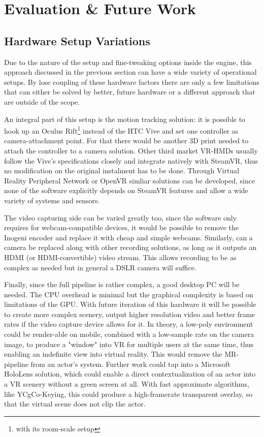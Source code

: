 %
\chapter{Evaluation \& Future Work}

\section{Hardware Setup Variations}
\label{sec:eval:hardware}

Due to the nature of the setup and fine-tweaking options inside the engine, 
this approach discussed in the previous section can have a wide variety of 
operational setups. By lose coupling of these hardware factors there are only a 
few limitations that can either be solved by better, future hardware or a 
different approach that are outside of the scope.

An integral part of this setup is the motion tracking solution: it is possible 
to hook up an Oculus Rift\footnote{with its room-scale setup} instead of the 
HTC Vive and set one controller as camera-attachment point. For that there 
would be another 3D print needed to attach the controller to a camera solution. 
\newline
Other third market VR-HMDs usually follow the Vive's specifications closely and 
integrate natively with SteamVR, thus no modification on the original 
instalment has to be done.
\newline
Through Virtual Reality Peripheral Network or OpenVR simliar solutions can be 
developed, since none of the software explicitly depends on SteamVR features 
and allow a wide variety of systems and sensors.

The video capturing side can be varied greatly too, since the software only 
requires for webcam-compatible devices, it would be possible to remove 
the Inogeni encoder and replace it with cheap and simple webcams. Similarly, 
can a camera be replaced along with other recording solutions, as long as it 
outputs an HDMI (or HDMI-convertible) video stream. This allows recording to be 
as complex as needed but in general a DSLR camera will suffice.

Finally, since the full pipeline is rather complex, a good desktop PC will be 
needed. The CPU overhead is minimal but the graphical complexity is based on 
limitations of the GPU. With future iteration of this hardware it will be 
possible to create more complex scenery, output higher resolution video and 
better frame rates if the video capture device allows for it.
\newline
In theory, a low-poly environment could be render-able on mobile, combined with 
a low-sample rate on the camera image, to produce a "window" into VR for 
multiple users at the same time, thus enabling an indefinite view into virtual 
reality. This would remove the MR-pipeline from an actor's system. Further work 
could tap into a Microsoft HoloLens solution, which could enable a direct 
contextualization of an actor into a VR scenery without a green screen at all. 
With fast approximate algorithms, like YCgCo-Keying, this could produce a 
high-framerate transparent overlay, so that the virtual scene does not clip the 
actor.

